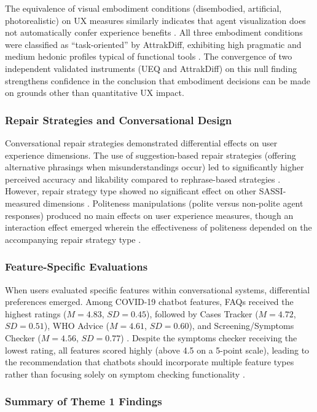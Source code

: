 \documentclass[manuscript,anonymous,sigconf]{acmart}
\begin{document}
The equivalence of visual embodiment conditions (disembodied, artificial, photorealistic) on UX measures similarly indicates that agent visualization does not automatically confer experience benefits \cite{A86}. All three embodiment conditions were classified as ``task-oriented'' by AttrakDiff, exhibiting high pragmatic and medium hedonic profiles typical of functional tools \cite{A86}. The convergence of two independent validated instruments (UEQ and AttrakDiff) on this null finding strengthens confidence in the conclusion that embodiment decisions can be made on grounds other than quantitative UX impact.

\subsubsection{Repair Strategies and Conversational Design}

Conversational repair strategies demonstrated differential effects on user experience dimensions. The use of suggestion-based repair strategies (offering alternative phrasings when misunderstandings occur) led to significantly higher perceived accuracy and likability compared to rephrase-based strategies \cite{A13}. However, repair strategy type showed no significant effect on other SASSI-measured dimensions \cite{A13}. Politeness manipulations (polite versus non-polite agent responses) produced no main effects on user experience measures, though an interaction effect emerged wherein the effectiveness of politeness depended on the accompanying repair strategy type \cite{A13}.

\subsubsection{Feature-Specific Evaluations}

When users evaluated specific features within conversational systems, differential preferences emerged. Among COVID-19 chatbot features, FAQs received the highest ratings ($M = 4.83$, $SD = 0.45$), followed by Cases Tracker ($M = 4.72$, $SD = 0.51$), WHO Advice ($M = 4.61$, $SD = 0.60$), and Screening/Symptoms Checker ($M = 4.56$, $SD = 0.77$) \cite{A79}. Despite the symptoms checker receiving the lowest rating, all features scored highly (above 4.5 on a 5-point scale), leading to the recommendation that chatbots should incorporate multiple feature types rather than focusing solely on symptom checking functionality \cite{A79}.

\subsubsection{Summary of Theme 1 Findings}
\end{document}
